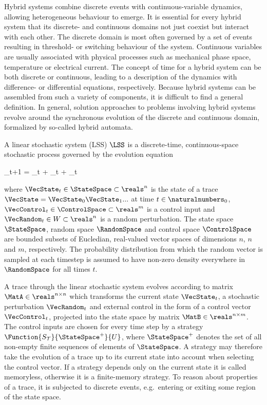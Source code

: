 Hybrid systems combine discrete events with continuous-variable dynamics, allowing heterogeneous behaviour to emerge.
It is essential for every hybrid system that its discrete- and continuous domains not just coexist but interact with each other.
The discrete domain is most often governed by a set of events resulting in threshold- or switching behaviour of the system.
Continuous variables are usually associated with physical processes such as mechanical phase space, temperature or electrical current.
The concept of time for a hybrid system can be both discrete or continuous, leading to a description of the dynamics with difference- or differential equations, respectively.
Because hybrid systems can be assembled from such a variety of components, it is difficult to find a general definition.
In general, solution approaches to problems involving hybrid systems revolve around the synchronous evolution of the discrete and continuous domain, formalized by so-called hybrid automata.


\startsubsection[title={Linear Stochastic Systems},reference=sec:theory-hybrids-lss]

    A linear stochastic system (LSS) $\LSS$ is a discrete-time, continuous-space stochastic process governed by the evolution equation

    \startformula
        \VecState_{t+1} = \MatA \VecState_t + \MatB \VecControl_t + \VecRandom_t \EndComma
    \stopformula

    where $\VecState_t \in \StateSpace \subset \reals^n$ is the state of a trace $\VecState = \VecState_0 \VecState_1 ...$ at time $t \in \naturalnumbers_0$,
    $\VecControl_t \in \ControlSpace \subset \reals^m$ is a control input and
    $\VecRandom_t \in W \subset \reals^n$ is a random perturbation.
    The state space $\StateSpace$, random space $\RandomSpace$ and control space $\ControlSpace$ are bounded subsets of Eucledian, real-valued vector spaces of dimensions $n$, $n$ and $m$, respectively.
    The probability distribution from which the random vector is sampled at each timestep is assumed to have non-zero density everywhere in $\RandomSpace$ for all times $t$.

    A trace through the linear stochastic system evolves according to matrix $\MatA \in \reals^{n \times n}$ which transforms the current state $\VecState_t$, a stochastic perturbation $\VecRandom_t$ and external control in the form of a control vector $\VecControl_t$, projected into the state space by matrix $\MatB \in \reals^{n \times m}$.
    The control inputs are chosen for every time step by a strategy $\Function{S_\mathcal{T}}{\StateSpace^+}{U}$, where $\StateSpace^+$ denotes the set of all non-empty finite sequences of elements of $\StateSpace$.
    A strategy may therefore take the evolution of a trace up to its current state into account when selecting the control vector.
    If a strategy depends only on the current state it is called memoryless, otherwise it is a finite-memory strategy.
    To reason about properties of a trace, it is subjected to discrete events, e.g.\ entering or exiting some region of the state space.

